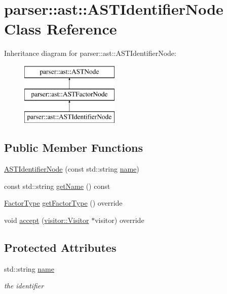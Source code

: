 \hypertarget{classparser_1_1ast_1_1ASTIdentifierNode}{}\section{parser\+:\+:ast\+:\+:A\+S\+T\+Identifier\+Node Class Reference}
\label{classparser_1_1ast_1_1ASTIdentifierNode}
Inheritance diagram for parser\+:\+:ast\+:\+:A\+S\+T\+Identifier\+Node\+:\begin{figure}[H]
\begin{center}
\leavevmode
\includegraphics[height=3.000000cm]{da/d8b/classparser_1_1ast_1_1ASTIdentifierNode}
\end{center}
\end{figure}
\subsection*{Public Member Functions}
\begin{DoxyCompactItemize}
\item 
\hyperlink{classparser_1_1ast_1_1ASTIdentifierNode_a14e111874a3d1a5181f9d889e12106e5}{A\+S\+T\+Identifier\+Node} (const std\+::string \hyperlink{classparser_1_1ast_1_1ASTIdentifierNode_a3f8f65fc7806e99f8074fa7e0d1c0cf4}{name})
\item 
const std\+::string \hyperlink{classparser_1_1ast_1_1ASTIdentifierNode_adcb3da6c49adf6341e9a477458cc5998}{get\+Name} () const
\item 
\hyperlink{ASTFactorNode_8h_afbe2fcc03ef15b74a0c1ed1cda7ab0e8}{Factor\+Type} \hyperlink{classparser_1_1ast_1_1ASTIdentifierNode_a7b759817af29784741596a4387b6547f}{get\+Factor\+Type} () override
\item 
void \hyperlink{classparser_1_1ast_1_1ASTIdentifierNode_a45633268cd67b109e9b9cc6d565e48f3}{accept} (\hyperlink{classvisitor_1_1Visitor}{visitor\+::\+Visitor} $\ast$visitor) override
\end{DoxyCompactItemize}
\subsection*{Protected Attributes}
\begin{DoxyCompactItemize}
\item 
\mbox{\label{classparser_1_1ast_1_1ASTIdentifierNode_a3f8f65fc7806e99f8074fa7e0d1c0cf4}} 
std\+::string \hyperlink{classparser_1_1ast_1_1ASTIdentifierNode_a3f8f65fc7806e99f8074fa7e0d1c0cf4}{name}
\begin{DoxyCompactList}\small\item\em the identifier \end{DoxyCompactList}\end{DoxyCompactItemize}


